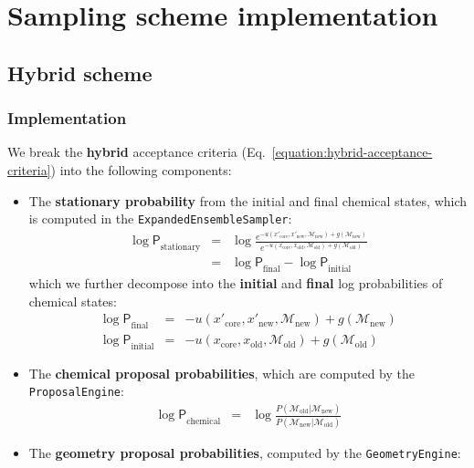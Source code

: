 \documentclass[aps,pre,twocolumn,nofootinbib,superscriptaddress,linenumbers,11point]{revtex4-1}
\newcommand{\logP}{{\log \mathsf{P}}}
\begin{document}
\section*{Sampling scheme implementation}

\subsection*{Hybrid scheme}

\subsubsection*{Implementation}

We break the {\bf hybrid} acceptance criteria (Eq.~\ref{equation:hybrid-acceptance-criteria}) into the following components:
\begin{itemize}
\item The {\bf stationary probability} from the initial and final chemical states, which is computed in the {\tt ExpandedEnsembleSampler}:
\begin{eqnarray}
\logP_\mathrm{stationary} &=& \log \frac{e^{-u(x'_\mathrm{core}, x'_\mathrm{new}, \mathcal{M}_\mathrm{new}) + g(\mathcal{M}_\mathrm{new})}}{e^{-u(x_\mathrm{core}, x_\mathrm{old}, \mathcal{M}_\mathrm{old}) + g(\mathcal{M}_\mathrm{old})}} \label{equation:hybrid-stationary} \\
&=& \logP_\mathrm{final} - \logP_\mathrm{initial}
\end{eqnarray}
which we further decompose into the {\bf initial} and {\bf final} log probabilities of chemical states:
\begin{eqnarray}
\logP_\mathrm{final} &=& -u(x'_\mathrm{core}, x'_\mathrm{new}, \mathcal{M}_\mathrm{new}) + g(\mathcal{M}_\mathrm{new}) \\
\logP_\mathrm{initial} &=& -u(x_\mathrm{core}, x_\mathrm{old}, \mathcal{M}_\mathrm{old}) + g(\mathcal{M}_\mathrm{old})
\end{eqnarray}
\item The {\bf chemical proposal probabilities}, which are computed by the {\tt ProposalEngine}:
\begin{eqnarray}
\logP_\mathrm{chemical} &=& \log \frac{P(\mathcal{M}_\mathrm{old} | \mathcal{M}_\mathrm{new})}{P(\mathcal{M}_\mathrm{new} | \mathcal{M}_\mathrm{old})} \label{equation:hybrid-chemical-state-proposal}
\end{eqnarray}
\item The {\bf geometry proposal probabilities}, computed by the {\tt GeometryEngine}:

\end{itemize}
\end{document}

